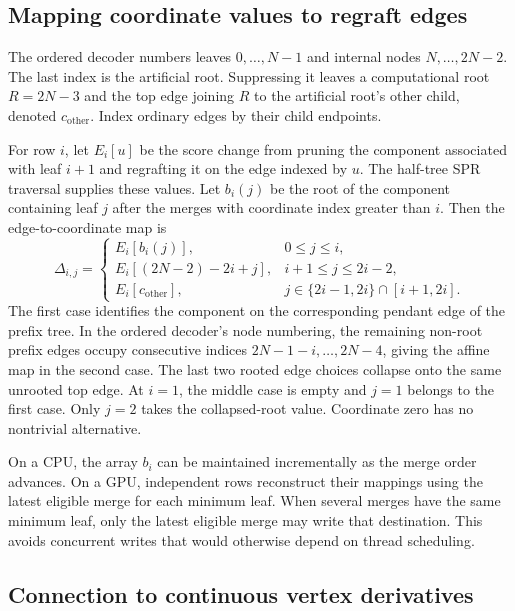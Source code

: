\subsection{Mapping coordinate values to regraft edges}
\label{sec:mapping}

The ordered decoder numbers leaves $0,\ldots,N-1$ and internal nodes $N,\ldots,2N-2$.
The last index is the artificial root.
Suppressing it leaves a computational root $R=2N-3$ and the top edge joining $R$ to the artificial root's other child, denoted $c_{\mathrm{other}}$.
Index ordinary edges by their child endpoints.

For row $i$, let $E_i[u]$ be the score change from pruning the component associated with leaf $i+1$ and regrafting it on the edge indexed by $u$.
The half-tree SPR traversal supplies these values.
Let $b_i(j)$ be the root of the component containing leaf $j$ after the merges with coordinate index greater than $i$.
Then the edge-to-coordinate map is
\begin{equation}
 \Delta_{i,j}=
 \begin{cases}
 E_i[b_i(j)], &0\leq j\leq i,\\[2pt]
 E_i[(2N-2)-2i+j], &i+1\leq j\leq2i-2,\\[2pt]
 E_i[c_{\mathrm{other}}], &j\in\{2i-1,2i\}\cap[i+1,2i].
 \end{cases}
 \label{eq:full_mapping}
\end{equation}
The first case identifies the component on the corresponding pendant edge of the prefix tree.
In the ordered decoder's node numbering, the remaining non-root prefix edges occupy consecutive indices $2N-1-i,\ldots,2N-4$, giving the affine map in the second case.
The last two rooted edge choices collapse onto the same unrooted top edge.
At $i=1$, the middle case is empty and $j=1$ belongs to the first case.
Only $j=2$ takes the collapsed-root value.
Coordinate zero has no nontrivial alternative.

On a CPU, the array $b_i$ can be maintained incrementally as the merge order advances.
On a GPU, independent rows reconstruct their mappings using the latest eligible merge for each minimum leaf.
When several merges have the same minimum leaf, only the latest eligible merge may write that destination.
This avoids concurrent writes that would otherwise depend on thread scheduling.

\subsection{Connection to continuous vertex derivatives}
\label{sec:vertex_gradient}

